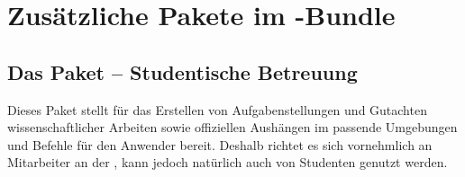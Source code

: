 \chapter{Zusätzliche Pakete im \TUDScript-Bundle}
\section{Das Paket  -- Studentische Betreuung}
%
Dieses Paket stellt für das Erstellen von Aufgabenstellungen und Gutachten  
wissenschaftlicher Arbeiten sowie offiziellen Aushängen im \CD passende 
Umgebungen und Befehle für den Anwender bereit. Deshalb richtet es sich 
vornehmlich an Mitarbeiter an der \TnUD, kann jedoch natürlich auch von 
Studenten genutzt werden.


